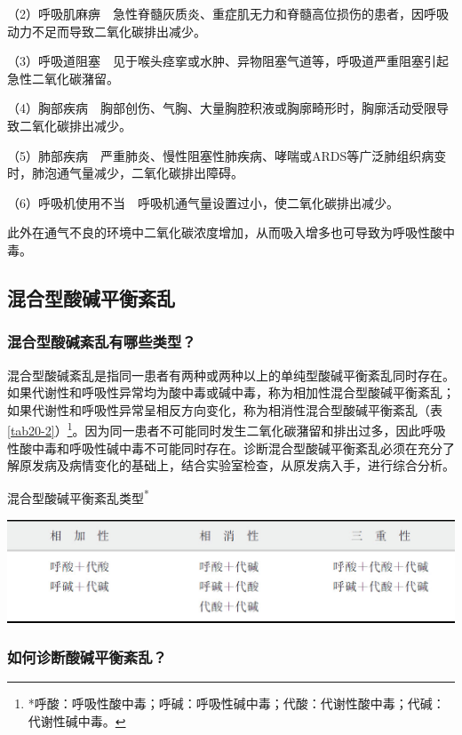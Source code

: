 （2）呼吸肌麻痹　急性脊髓灰质炎、重症肌无力和脊髓高位损伤的患者，因呼吸动力不足而导致二氧化碳排出减少。

（3）呼吸道阻塞　见于喉头痉挛或水肿、异物阻塞气道等，呼吸道严重阻塞引起急性二氧化碳潴留。

（4）胸部疾病　胸部创伤、气胸、大量胸腔积液或胸廓畸形时，胸廓活动受限导致二氧化碳排出减少。

（5）肺部疾病　严重肺炎、慢性阻塞性肺疾病、哮喘或ARDS等广泛肺组织病变时，肺泡通气量减少，二氧化碳排出障碍。

（6）呼吸机使用不当　呼吸机通气量设置过小，使二氧化碳排出减少。

此外在通气不良的环境中二氧化碳浓度增加，从而吸入增多也可导致为呼吸性酸中毒。

\subsection{混合型酸碱平衡紊乱}

\subsubsection{混合型酸碱紊乱有哪些类型？}

混合型酸碱紊乱是指同一患者有两种或两种以上的单纯型酸碱平衡紊乱同时存在。如果代谢性和呼吸性异常均为酸中毒或碱中毒，称为相加性混合型酸碱平衡紊乱；如果代谢性和呼吸性异常呈相反方向变化，称为相消性混合型酸碱平衡紊乱（表\ref{tab20-2}）\footnote{*呼酸：呼吸性酸中毒；呼碱：呼吸性碱中毒；代酸：代谢性酸中毒；代碱：代谢性碱中毒。}。因为同一患者不可能同时发生二氧化碳潴留和排出过多，因此呼吸性酸中毒和呼吸性碱中毒不可能同时存在。诊断混合型酸碱平衡紊乱必须在充分了解原发病及病情变化的基础上，结合实验室检查，从原发病入手，进行综合分析。

\begin{table}[htbp]
\centering
\caption{混合型酸碱平衡紊乱类型\textsuperscript{*}}
\label{tab20-2}
\includegraphics{./images/Image00219.jpg}
\end{table}



\subsubsection{如何诊断酸碱平衡紊乱？}

